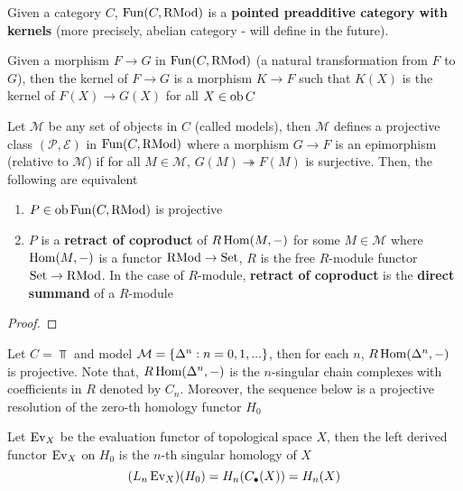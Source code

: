 \begin{remark}
	Given a category $C$, $\operatorname{Fun}(C, \operatorname{RMod})$ is a \textbf{pointed preadditive category with kernels} (more precisely, abelian category - will define in the future).
	
	Given a morphism $F \to G$ in $\operatorname{Fun}(C, \operatorname{RMod})$ (a natural transformation from $F$ to $G$), then the kernel of $F \to G$ is a morphism $K \to F$ such that $K(X)$ is the kernel of $F(X) \to G(X)$ for all $X \in \operatorname{ob} C$
\end{remark}

\begin{remark}
	Let $\mathcal{M}$ be any set of objects in $C$ (called models), then $\mathcal{M}$ defines a projective class $(\mathcal{P}, \mathcal{E})$ in $\operatorname{Fun}(C, \operatorname{RMod})$ where a morphism $G \to F$ is an epimorphism (relative to $\mathcal{M}$) if for all $M \in \mathcal{M}$, $G(M) \twoheadrightarrow F(M)$ is surjective. Then, the following are equivalent
	
	\begin{enumerate}
		\item $P \in \operatorname{ob} \operatorname{Fun}(C, \operatorname{RMod})$ is projective
		\item $P$ is a \textbf{retract of coproduct} of $R \operatorname{Hom}(M, -)$ for some $M \in \mathcal{M}$ where $\operatorname{Hom}(M, -)$ is a functor $\operatorname{RMod} \to \operatorname{Set}$, $R$ is the free $R$-module functor $\operatorname{Set} \to \operatorname{RMod}$. In the case of $R$-module, \textbf{retract of coproduct} is the \textbf{direct summand} of a $R$-module
	\end{enumerate}
\end{remark}

\begin{proof}
\end{proof}

\begin{remark}
	Let $C = \Top$ and model $\mathcal{M} = \{\Delta^n: n=0, 1, ...\}$, then for each $n$, $R \operatorname{Hom}(\Delta^n, -)$ is projective. Note that, $R \operatorname{Hom}(\Delta^n, -)$ is the $n$-singular chain complexes with coefficients in $R$ denoted by $C_n$. Moreover, the sequence below is a projective resolution of the zero-th homology functor $H_0$
	
	\begin{center}
	\end{center}
	
	Let $\operatorname{Ev}_X$ be the evaluation functor of topological space $X$, then the left derived functor $\operatorname{Ev}_X$ on $H_0$ is the $n$-th singular homology of $X$
	$$
	(L_n \operatorname{Ev}_X)(H_0) = H_n(C_\bullet(X)) = H_n(X)
	$$
\end{remark}


